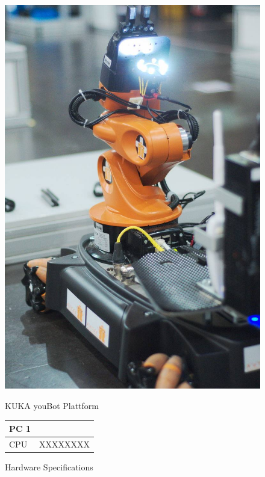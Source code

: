\begin{figure}[htbp]
	\begin{minipage}{0.45\textwidth}
		\includegraphics[width=\textwidth]{img/YoubotInAction.jpg}
		\caption{KUKA youBot Plattform}
		\label{fig:youBot}
	\end{minipage}
	\hfill
	\begin{minipage}{0.45\textwidth}
		\renewcommand*\figurename{Tab.}
		\setcounter{figure}{0}
		\centering
		\caption{Hardware Specifications}
		\begin{tabular}{ | p{2cm} | p{3cm} | }
			\hline
			\bfseries{PC 1} &  \\
			\hline
			CPU & XXXXXXXX \\

\end{tabular}
\end{minipage}
\end{figure}
